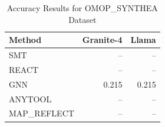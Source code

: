 \begin{table}[htbp]
\centering
\caption{Accuracy Results for OMOP_SYNTHEA Dataset}
\label{tab:omop_synthea_accuracy}
\begin{tabular}{lrr}
\toprule
\textbf{Method} & \textbf{Granite-4} & \textbf{Llama} \\
\midrule
SMT & -- & -- \\
REACT & -- & -- \\
GNN & 0.215 & 0.215 \\
ANYTOOL & -- & -- \\
MAP_REFLECT & -- & -- \\
\bottomrule
\end{tabular}
\end{table}


